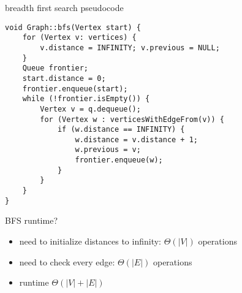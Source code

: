 \begin{frame}[fragile,label=bfsPseudo]{breadth first search pseudocode}
\lstset{language=C++,style=smaller}
\begin{lstlisting}
void Graph::bfs(Vertex start) {
    for (Vertex v: vertices) {
        v.distance = INFINITY; v.previous = NULL;
    }
    Queue frontier;
    start.distance = 0;
    frontier.enqueue(start);
    while (!frontier.isEmpty()) {
        Vertex v = q.dequeue();
        for (Vertex w : verticesWithEdgeFrom(v)) {
            if (w.distance == INFINITY) {
                w.distance = v.distance + 1;
                w.previous = v;
                frontier.enqueue(w);
            } 
        }
    }
}
\end{lstlisting}
\end{frame}

\begin{frame}{BFS runtime?}
\begin{itemize}
\item need to initialize distances to infinity: $\Theta(|V|)$ operations
\item need to check every edge: $\Theta(|E|)$ operations
\item runtime $\Theta(|V|+|E|)$
\end{itemize}
\end{frame}
